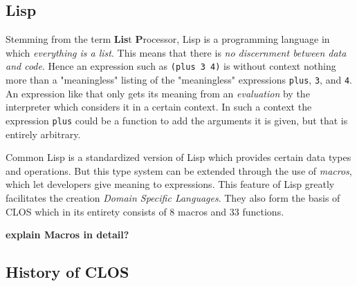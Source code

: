 \documentclass[oribibl]{llncs}
\begin{document}
\subsection{Lisp}
\label{sec:lisp}

Stemming from the term \textbf{Lis}t \textbf{P}rocessor, Lisp is a programming language in which \emph{everything is a list}. This means that there is \emph{no discernment between data and code}. Hence an expression such as \texttt{(plus 3 4)} is without context nothing more than a "meaningless" listing of the "meaningless" expressions \texttt{plus}, \texttt{3}, and \texttt{4}. An expression like that only gets its meaning from an \emph{evaluation} by the interpreter which considers it in a certain context. In such a context the expression \texttt{plus} could be a function to add the arguments it is given, but that is entirely arbitrary. 

Common Lisp is a standardized version of Lisp which provides certain data types and operations. But this type system can be extended through the use of \emph{macros}, which let developers give meaning to expressions. This feature of Lisp greatly facilitates the creation \emph{Domain Specific Languages}. \cite{fowler2011domain-specific} They also form the basis of CLOS which in its entirety consists of 8 macros and 33 functions.


\textbf{explain Macros in detail?}


\subsection{History of CLOS}
\label{sec:history}
\end{document}
